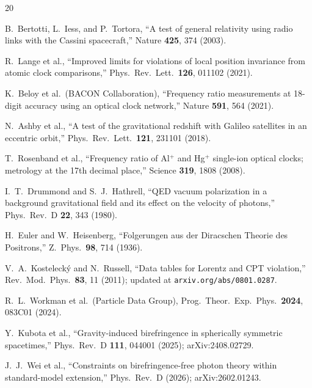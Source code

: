 \documentclass[11pt,a4paper]{article}
\theoremstyle{definition}
\begin{document}
\begin{thebibliography}{20}

B.~Bertotti, L.~Iess, and P.~Tortora,
``A test of general relativity using radio links with the Cassini spacecraft,''
Nature \textbf{425}, 374 (2003).

R.~Lange et al.,
``Improved limits for violations of local position invariance from atomic clock comparisons,''
Phys.\ Rev.\ Lett.\ \textbf{126}, 011102 (2021).

K.~Beloy et al.\ (BACON Collaboration),
``Frequency ratio measurements at 18-digit accuracy using an optical clock network,''
Nature \textbf{591}, 564 (2021).

N.~Ashby et al.,
``A test of the gravitational redshift with Galileo satellites in an eccentric orbit,''
Phys.\ Rev.\ Lett.\ \textbf{121}, 231101 (2018).

T.~Rosenband et al.,
``Frequency ratio of Al$^+$ and Hg$^+$ single-ion optical clocks; metrology at the 17th decimal place,''
Science \textbf{319}, 1808 (2008).

I.~T.~Drummond and S.~J.~Hathrell,
``QED vacuum polarization in a background gravitational field and its effect on the velocity of photons,''
Phys.\ Rev.\ D \textbf{22}, 343 (1980).

H.~Euler and W.~Heisenberg,
``Folgerungen aus der Diracschen Theorie des Positrons,''
Z.~Phys.\ \textbf{98}, 714 (1936).

V.~A.~Kosteleck\'y and N.~Russell,
``Data tables for Lorentz and CPT violation,''
Rev.\ Mod.\ Phys.\ \textbf{83}, 11 (2011);
updated at \texttt{arxiv.org/abs/0801.0287}.

R.~L.~Workman et al.\ (Particle Data Group),
Prog.\ Theor.\ Exp.\ Phys.\ \textbf{2024}, 083C01 (2024).

Y.~Kubota et al.,
``Gravity-induced birefringence in spherically symmetric spacetimes,''
Phys.\ Rev.\ D \textbf{111}, 044001 (2025);
arXiv:2408.02729.

J.~J.~Wei et al.,
``Constraints on birefringence-free photon theory within standard-model extension,''
Phys.\ Rev.\ D (2026); arXiv:2602.01243.

\end{thebibliography}
\end{document}
